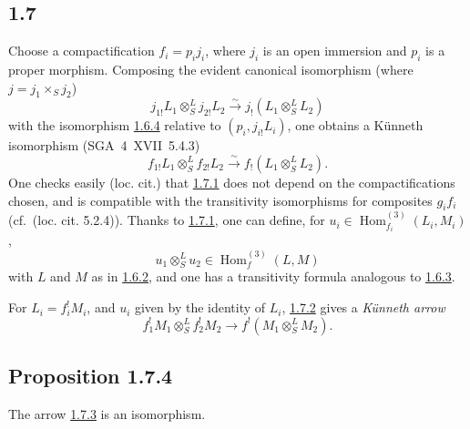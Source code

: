 \documentclass[11pt]{article}
\DeclareMathOperator{\Hom}{Hom}
\providecommand{\Hom}{\operatorname{Hom}}
\providecommand{\Hom}{\operatorname{Hom}}
\begin{document}
\subsection*{1.7}\label{sga5:III:subsection:1.7}
Choose a compactification $f_i=p_i j_i$, where $j_i$ is an open immersion and $p_i$ is a proper morphism. Composing the evident canonical isomorphism (where $j=j_1\times_Sj_2$)
\[
j_{1!}L_1\otimes^L_Sj_{2!}L_2\xrightarrow{\sim}j_{!}(L_1\otimes^L_SL_2)
\]
with the isomorphism \hyperref[sga5:III:equation:1.6.4]{1.6.4} relative to $(p_i,j_{i!}L_i)$, one obtains a Künneth isomorphism (SGA~4~XVII~5.4.3)
\begin{equation}\tag{1.7.1}\label{sga5:III:equation:1.7.1}
f_{1!}L_1\otimes^L_Sf_{2!}L_2\xrightarrow{\sim}f_{!}(L_1\otimes^L_SL_2).
\end{equation}
One checks easily (loc. cit.) that \hyperref[sga5:III:equation:1.7.1]{1.7.1} does not depend on the compactifications chosen, and is compatible with the transitivity isomorphisms for composites $g_if_i$ (cf.~(loc. cit. 5.2.4)). Thanks to \hyperref[sga5:III:equation:1.7.1]{1.7.1}, one can define, for $u_i\in\Hom_{f_i}^{(3)}(L_i,M_i)$,
\begin{equation}\tag{1.7.2}\label{sga5:III:equation:1.7.2}
u_1\otimes^L_Su_2\in\Hom_f^{(3)}(L,M)
\end{equation}
with $L$ and $M$ as in \hyperref[sga5:III:equation:1.6.2]{1.6.2}, and one has a transitivity formula analogous to \hyperref[sga5:III:equation:1.6.3]{1.6.3}.

For $L_i=f_i^{!}M_i$, and $u_i$ given by the identity of $L_i$, \hyperref[sga5:III:equation:1.7.2]{1.7.2} gives a \emph{Künneth arrow}
\begin{equation}\tag{1.7.3}\label{sga5:III:equation:1.7.3}
f_1^{!}M_1\otimes^L_Sf_2^{!}M_2\longrightarrow f^{!}(M_1\otimes^L_SM_2).
\end{equation}

\subsection*{Proposition 1.7.4}\label{sga5:III:proposition:1.7.4}
The arrow \hyperref[sga5:III:equation:1.7.3]{1.7.3} is an isomorphism.
\end{document}
